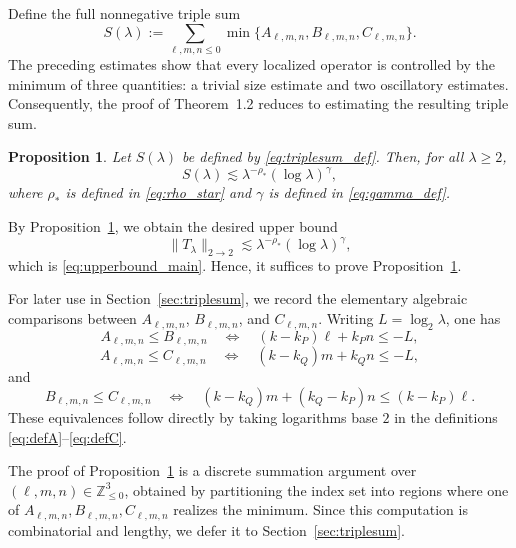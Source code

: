 \documentclass[10pt]{amsart}
\numberwithin{equation}{section}
\newtheorem{proposition}[theorem]{Proposition}
\theoremstyle{definition}
\theoremstyle{remark}
\theoremstyle{remark}
\newcommand{\Z}{\mathbb{Z}}
\begin{document}
	Define the full nonnegative triple sum
	\begin{equation}\label{eq:triplesum_def}
		S(\lambda)
		:=
		\sum_{\ell,m,n\le0}
		\min\{A_{\ell,m,n},B_{\ell,m,n},C_{\ell,m,n}\}.
	\end{equation}
	The preceding estimates show that every localized operator is controlled by
    the minimum of three quantities:
    a trivial size estimate and two oscillatory estimates.
    Consequently, the proof of Theorem~1.2 reduces to estimating the resulting triple sum.
    \begin{proposition}\label{prop:triplesum}
			Let \(S(\lambda)\) be defined by \eqref{eq:triplesum_def}.  Then, for all \(\lambda\ge2\),
			\begin{equation}\label{eq:triplesum_bound}
				S(\lambda)
				\lesssim
				\lambda^{-\rho_*}(\log\lambda)^{\gamma},
			\end{equation}
			where \(\rho_*\) is defined in \eqref{eq:rho_star} and \(\gamma\) is defined in \eqref{eq:gamma_def}.
	\end{proposition}
	
	By Proposition~\ref{prop:triplesum}, we obtain the desired upper bound
	\[
	\|T_\lambda\|_{2\to2}
	\lesssim
	\lambda^{-\rho_*}(\log\lambda)^\gamma,
	\]
	which is \eqref{eq:upperbound_main}. Hence, it suffices to prove Proposition~\ref{prop:triplesum}.
	
	
		For later use in Section~\ref{sec:triplesum}, we record the elementary algebraic comparisons between
		\(A_{\ell,m,n}\), \(B_{\ell,m,n}\), and \(C_{\ell,m,n}\).  Writing \(L=\log_2\lambda\), one has
		\[
		A_{\ell,m,n}\le B_{\ell,m,n}
		\quad\Longleftrightarrow\quad
		(k-k_P)\ell+k_P n\le -L,
		\]
		\[
		A_{\ell,m,n}\le C_{\ell,m,n}
		\quad\Longleftrightarrow\quad
		(k-k_Q)m+k_Q n\le -L,
		\]
		and
		\[
		B_{\ell,m,n}\le C_{\ell,m,n}
		\quad\Longleftrightarrow\quad
		(k-k_Q)m+(k_Q-k_P)n\le (k-k_P)\ell.
		\]
		These equivalences follow directly by taking logarithms base \(2\) in the definitions
		\eqref{eq:defA}--\eqref{eq:defC}.
	
	
	The proof of Proposition~\ref{prop:triplesum} is a discrete summation argument over $(\ell,m,n)\in\Z_{\le0}^3$, obtained by partitioning the index set into regions where one of
	$A_{\ell,m,n},B_{\ell,m,n},C_{\ell,m,n}$ realizes the minimum. Since this computation is combinatorial and lengthy, we defer it to Section~\ref{sec:triplesum}.
	
	
	
	
	
	
	
\end{document}
